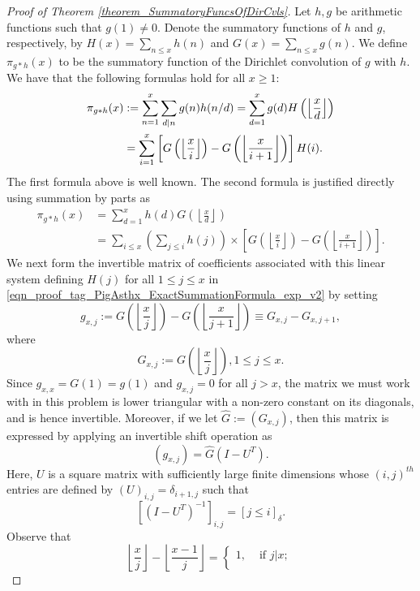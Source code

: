 \documentclass[11pt,reqno,a4letter]{article}
\numberwithin{figure}{section}
\numberwithin{table}{section}
\newcommand{\Iverson}[1]{\ensuremath{\left[#1\right]_{\delta}}}
\newcommand{\floor}[1]{\left\lfloor #1 \right\rfloor}
\newcommand{\Floor}[2]{\ensuremath{\left\lfloor \frac{#1}{#2} \right\rfloor}}
\theoremstyle{plain}
\numberwithin{theorem}{section}
\theoremstyle{definition}
\begin{document}
\begin{proof}[Proof of Theorem \ref{theorem_SummatoryFuncsOfDirCvls}] 
\label{proofOf_theorem_SummatoryFuncsOfDirCvls} 
Let $h,g$ be arithmetic functions such that $g(1) \neq 0$. 
Denote the summatory functions of $h$ and $g$, 
respectively, by $H(x) = \sum_{n \leq x} h(n)$ and $G(x) = \sum_{n \leq x} g(n)$. 
We define $\pi_{g \ast h}(x)$ to be the summatory function of the 
Dirichlet convolution of $g$ with $h$. 
We have that the following formulas hold for all $x \geq 1$: 
\begin{align} 
\notag 
\pi_{g \ast h}(x) & := \sum_{n=1}^{x} \sum_{d|n} g(n) h(n/d) = \sum_{d=1}^x g(d) H\left(\floor{\frac{x}{d}}\right) \\ 
\label{eqn_proof_tag_PigAsthx_ExactSummationFormula_exp_v2} 
     & = \sum_{i=1}^x \left[G\left(\floor{\frac{x}{i}}\right) - G\left(\floor{\frac{x}{i+1}}\right)\right] H(i). 
\end{align} 
The first formula above is well known. The second formula is justified directly using 
summation by parts as \cite[\S 2.10(ii)]{NISTHB} 
\begin{align*} 
\pi_{g \ast h}(x) & = \sum_{d=1}^x h(d) G\left(\floor{\frac{x}{d}}\right) \\ 
     & = \sum_{i \leq x} \left(\sum_{j \leq i} h(j)\right) \times 
     \left[G\left(\floor{\frac{x}{i}}\right) - 
     G\left(\floor{\frac{x}{i+1}}\right)\right]. 
\end{align*} 
We next form the invertible matrix of coefficients associated with this linear system defining $H(j)$ for all 
$1 \leq j \leq x$ in \eqref{eqn_proof_tag_PigAsthx_ExactSummationFormula_exp_v2} by setting 
\[
g_{x,j} := G\left(\floor{\frac{x}{j}}\right) - G\left(\floor{\frac{x}{j+1}}\right) \equiv G_{x,j} - G_{x,j+1}, 
\] 
where 
\[
G_{x,j} := G\left(\Floor{x}{j}\right), 1 \leq j \leq x. 
\]
Since $g_{x,x} = G(1) = g(1)$ and $g_{x,j} = 0$ for all $j > x$, 
the matrix we must work with in this problem is lower triangular with a non-zero 
constant on its diagonals, and is hence invertible. 
Moreover, if we let $\hat{G} := (G_{x,j})$, then this matrix is 
expressed by applying an invertible shift operation as 
\[
(g_{x,j}) = \hat{G} (I - U^{T}). 
\]
Here, $U$ is a square matrix with sufficiently large finite dimensions 
whose $(i,j)^{th}$ entries are defined by $(U)_{i,j} = \delta_{i+1,j}$ such that 
\[
\left[(I - U^T)^{-1}\right]_{i,j} = \Iverson{j \leq i}. 
\]
Observe that 
\[
\Floor{x}{j} - \Floor{x-1}{j} = \begin{cases} 
     1, & \text{ if $j|x$; } \\ 

\end{cases}\]
\end{proof}
\end{document}
